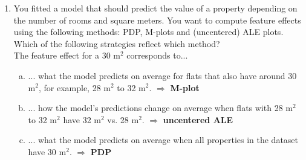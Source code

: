 {\begin{enumerate}
\item You fitted a model that should predict the value of a property depending on 
    the number of rooms and square meters. 
    You want to compute feature effects using the following methods: 
    PDP, M-plots and (uncentered) ALE plots. 
    Which of the following strategies reflect which method? \\
    The feature effect for a 30 m$^2$ corresponds to... 
\begin{enumerate}[a)]
  \item ... what the model predicts on average for flats that also have around 30 m$^2$, for example, 28 m$^2$ to 32 m$^2$. $\Rightarrow$ \textbf{M-plot}
  \item ... how the model's predictions change on average when flats with 28 m$^2$ to 32 m$^2$ have 32 m$^2$ vs. 28 m$^2$. $\Rightarrow$ \textbf{uncentered ALE}
  \item ... what the model predicts on average when all properties in the dataset have 30 m$^2$. $\Rightarrow$ \textbf{PDP}
\end{enumerate}

\end{enumerate}
}